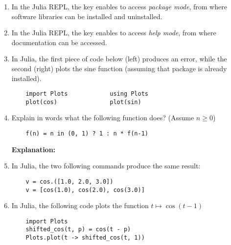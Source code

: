 \documentclass{article}
\begin{document}
\pagestyle{empty}
\thispagestyle{fancy}




\begin{enumerate}
    \item
        In the Julia REPL, the key  enables to access \emph{package mode},
        from where software libraries can be installed and uninstalled.

    \item
        In the Julia REPL, the key \julia{]} enables to access \emph{help mode},
        from where documentation can be accessed.

    \item
        In Julia, the first piece of code below (left) produces an error,
        while the second (right) plots the sine function
        (assuming that package  is already installed).

        \begin{verbatim}
    import Plots            using Plots
    plot(cos)               plot(sin)
        \end{verbatim}

    \item
        Explain in words what the following function does? (Assume $n \geq 0$)
        \begin{verbatim}
    f(n) = n in (0, 1) ? 1 : n * f(n-1)
        \end{verbatim}
        \textbf{Explanation:}

    \item
        In Julia, the two following commands produce the same result:
        \begin{verbatim}
    v = cos.([1.0, 2.0, 3.0])
    v = [cos(1.0), cos(2.0), cos(3.0)]
        \end{verbatim}

    \item
        In Julia, the following code plots the function $t \mapsto \cos(t - 1)$
        \begin{verbatim}
    import Plots
    shifted_cos(t, p) = cos(t - p)
    Plots.plot(t -> shifted_cos(t, 1))
        \end{verbatim}


\end{enumerate}
\end{document}
